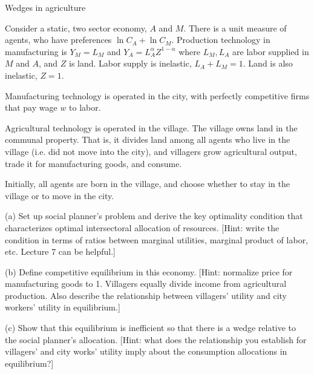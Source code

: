 Wedges in agriculture

Consider a static, two sector economy, $A$ and $M$. There is a unit measure of agents, who have preferences $\ln C_A+\ln C_M$. Production technology in manufacturing is $Y_M=L_M$ and $Y_A=L_A^\alpha Z^{1-\alpha}$ where $L_M, L_A$ are labor supplied in $M$ and $A$, and $Z$ is land. Labor supply is inelastic, $L_A+L_M=1$. Land is also inelastic, $Z=1$.

Manufacturing technology is operated in the city, with perfectly competitive firms that pay wage $w$ to labor.

Agricultural technology is operated in the village. The village owns land in the communal property. That is, it divides land among all agents who live in the village (i.e. did not move into the city), and villagers grow agricultural output, trade it for manufacturing goods, and consume.

Initially, all agents are born in the village, and choose whether to stay in the village or to move in the city.

(a) Set up social planner's problem and derive the key optimality condition that characterizes optimal intersectoral allocation of resources. [Hint: write the condition in terms of ratios between marginal utilities, marginal product of labor, etc. Lecture 7 can be helpful.]

(b) Define competitive equilibrium in this economy. [Hint: normalize price for manufacturing goods to 1. Villagers equally divide income from agricultural production. Also describe the relationship between villagers' utility and city workers' utility in equilibrium.]

(c) Show that this equilibrium is inefficient so that there is a wedge relative to the social planner's allocation. [Hint: what does the relationship you establish for villagers' and city works' utility imply about the consumption allocations in equilibrium?]